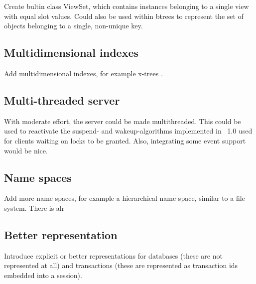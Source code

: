 Create bultin class ViewSet, which contains instances belonging to a
single view with equal slot values. Could also be used within btrees
to represent the set of objects belonging to a single, non-unique key.

\subsection{Multidimensional indexes}

Add multidimensional indexes, for example x-trees
\cite{bib:Berchtold-et-al-96,bib:Beckmann-et-al-90}.

\subsection{Multi-threaded server}

With moderate effort, the server could be made multithreaded. This
could be used to reactivate the suspend- and wakeup-algorithms
implemented in \plob\ 1.0 used for clients waiting on locks to be
granted. Also, integrating some event support would be nice.

\subsection{Name spaces}

Add more name spaces, for example a hierarchical name space, similar
to a file system. There is alr

\subsection{Better representation}

Introduce explicit or better representations for databases (these are
not represented at all) and transactions (these are represented as
transaction ids embedded into a session).

